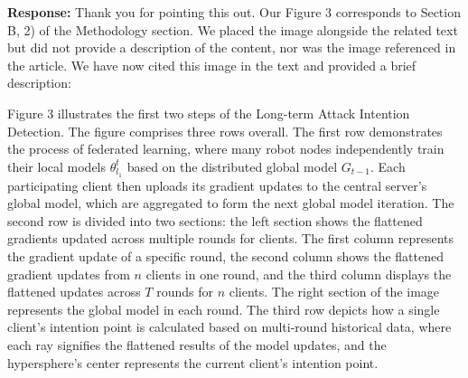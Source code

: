 \documentclass[a4paper,twoside,11pt,dvipsnames]{reviewresponse}
\begin{document}

\textbf{Response:} Thank you for pointing this out. Our Figure 3 corresponds to Section B, 2) of the Methodology section. We placed the image alongside the related text but did not provide a description of the content, nor was the image referenced in the article. We have now cited this image in the text and provided a brief description:

Figure 3 illustrates the first two steps of the Long-term Attack Intention Detection. The figure comprises three rows overall. The first row demonstrates the process of federated learning, where many robot nodes independently train their local models \( \theta^t_{l_1} \) based on the distributed global model \( G_{t-1} \). Each participating client then uploads its gradient updates to the central server's global model, which are aggregated to form the next global model iteration. The second row is divided into two sections: the left section shows the flattened gradients updated across multiple rounds for clients. The first column represents the gradient update of a specific round, the second column shows the flattened gradient updates from \( n \) clients in one round, and the third column displays the flattened updates across \( T \) rounds for \( n \) clients. The right section of the image represents the global model in each round. The third row depicts how a single client's intention point is calculated based on multi-round historical data, where each ray signifies the flattened results of the model updates, and the hypersphere's center represents the current client's intention point.
\end{document}
